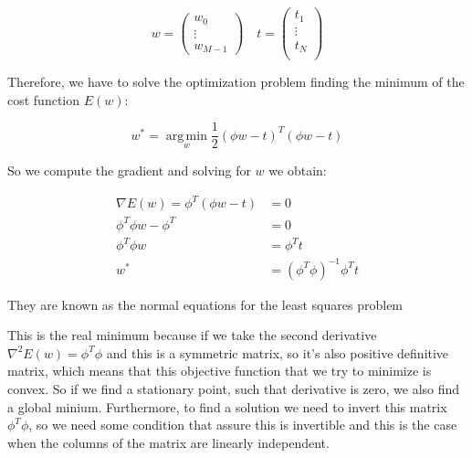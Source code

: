 \begin{Equation}[!htb]
	\centering
	\begin{equation}
	w = 
	\begin{pmatrix}
	w_0 \\
	\vdots \\
	w_{M-1}
	\end{pmatrix}
	\quad t =
	\begin{pmatrix}
	t_1 \\
	\vdots \\
	t_N \\
	\end{pmatrix}
	\end{equation}
	\label{eq:hommatrix}
\end{Equation}

Therefore, we have to solve the optimization problem finding the minimum of the cost function $E(w)$:
\begin{Equation}[H]
	\centering
	\begin{equation}
	w^*= \operatorname*{arg\,min}_w  \frac{1}{2}(\phi w - t)^T (\phi w - t)
	\end{equation}
	\label{eq:mathmodelaada}
\end{Equation}

So we compute the gradient and solving for $w$ we obtain:
\begin{Equation}[H]
	\centering
	\begin{equation}
		\begin{aligned}
			\nabla E(w) = \phi^T(\phi w - t) &= 0 \\
			\phi^T \phi w - \phi^T &= 0 \\
			\phi^T \phi w &= \phi^T t \\
			w^* &= (\phi^T \phi)^{-1} \phi^T t
		\end{aligned}
	\end{equation}
	\caption[Normal equations.]{They are known as the normal equations for the least squares problem}
	\label{eq:mathmodelaada}
\end{Equation}

\noindent This is the real minimum because if we take the second derivative $ \nabla^2 E(w) = \phi^T \phi $ and this is a symmetric matrix, so it's also positive definitive matrix, which means that this objective function that we try to minimize is convex. So if we find a stationary point, such that derivative is zero, we also find a global minium. Furthermore, to find a solution we need to invert this matrix $ \phi^T \phi $, so we need some condition that assure this is invertible and this is the case when the columns of the matrix are linearly independent. 


